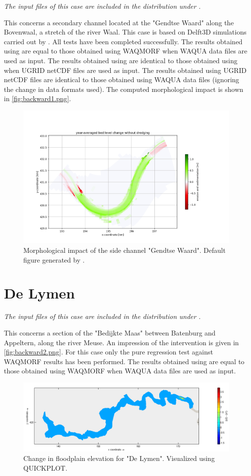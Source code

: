 \emph{The input files of this case are included in the distribution under .}

This concerns a secondary channel located at the "Gendtse Waard" along the Bovenwaal, a stretch of the river Waal.
This case is based on Delft3D simulations carried out by \citet{Ottevangeretal2016}.
All tests have been completed successfully.
The results obtained using  are equal to those obtained using WAQMORF when WAQUA data files are used as input.
The results obtained using  are identical to those obtained using  when UGRID netCDF files are used as input. 
The results obtained using UGRID netCDF files are identical to those obtained using WAQUA data files (ignoring the change in data formats used).
The computed morphological impact is shown in \autoref{fig:backward1.png}.

\begin{figure}[H]
\center
\includegraphics[width=12cm]{figures/report_Figure1.png}
\caption{Morphological impact of the side channel "Gendtse Waard".
Default figure generated by \dfmi.}
\label{fig:backward1.png}
\end{figure}

\section{De Lymen}\label{Sec:DeLymen_backward}

\emph{The input files of this case are included in the distribution under .}

This concerns a section of the "Bedijkte Maas" between Batenburg and Appeltern, along the river Meuse.
An impression of the intervention is given in \autoref{fig:backward2.png}.
For this case only the pure regression test against WAQMORF results has been performed.
The results obtained using  are equal to those obtained using WAQMORF when WAQUA data files are used as input.

\begin{figure}[H]
\center
\includegraphics[width=12cm]{figures/Lymen_dz.png}
\caption{Change in floodplain elevation for "De Lymen".
Visualized using QUICKPLOT.}
\label{fig:backward2.png}
\end{figure}